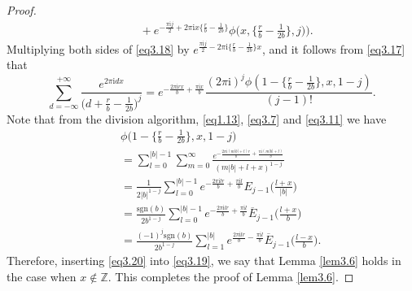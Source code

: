 \documentclass[10pt,a4paper]{amsart}
\begin{document}
\begin{proof}
\begin{eqnarray}
&&\quad+e^{-\frac{\pi \mathrm{i}j}{2}+2\pi\mathrm{i}x\{\frac{r}{b}-\frac{1}{2b}\}}\phi\biggl(x,\biggl\{\frac{r}{b}-\frac{1}{2b}\biggl\},j\biggl)\biggl).
\end{eqnarray}
Multiplying both sides of \eqref{eq3.18} by $e^{\frac{\pi \mathrm{i}j}{2}-2\pi\mathrm{i}\{\frac{r}{b}-\frac{1}{2b}\}x}$, and it follows from \eqref{eq3.17} that
\begin{equation}\label{eq3.19}
\sum_{d=-\infty}^{+\infty}\frac{e^{2\pi \mathrm{i}dx}}{\bigl(d+\frac{r}{b}-\frac{1}{2b}\bigl)^{j}}
=e^{-\frac{2\pi \mathrm{i}rx}{b}+\frac{\pi \mathrm{i}x}{b}}\frac{(2\pi \mathrm{i})^{j}\phi(1-\{\frac{r}{b}-\frac{1}{2b}\},x,1-j)}{(j-1)!}.
\end{equation}
Note that from the division algorithm, \eqref{eq1.13}, \eqref{eq3.7} and \eqref{eq3.11} we have
\begin{eqnarray}\label{eq3.20}
&&\phi\biggl(1-\biggl\{\frac{r}{b}-\frac{1}{2b}\biggl\},x,1-j\biggl)\nonumber\\
&&=\sum_{l=0}^{|b|-1}\sum_{m=0}^{\infty}\frac{e^{-\frac{2\pi \mathrm{i}(m|b|+l)r}{b}+\frac{\pi \mathrm{i}(m|b|+l)}{b}}}{(m|b|+l+x)^{1-j}}\nonumber\\
&&=\frac{1}{2|b|^{1-j}}\sum_{l=0}^{|b|-1}e^{-\frac{2\pi \mathrm{i}lr}{b}+\frac{\pi \mathrm{i}l}{b}}E_{j-1}\biggl(\frac{l+x}{|b|}\biggl)\nonumber\\
&&=\frac{\mathrm{sgn}(b)}{2b^{1-j}}\sum_{l=0}^{|b|-1}e^{-\frac{2\pi \mathrm{i}lr}{b}+\frac{\pi \mathrm{i}l}{b}}\overline{E}_{j-1}\biggl(\frac{l+x}{b}\biggl)\nonumber\\
&&=\frac{(-1)^{j}\mathrm{sgn}(b)}{2b^{1-j}}\sum_{l=1}^{|b|}e^{\frac{2\pi \mathrm{i}lr}{b}-\frac{\pi \mathrm{i}l}{b}}\overline{E}_{j-1}\biggl(\frac{l-x}{b}\biggl).
\end{eqnarray}
Therefore, inserting \eqref{eq3.20} into \eqref{eq3.19}, we say that Lemma \ref{lem3.6} holds in the case when $x\not\in\mathbb{Z}$. This completes the proof of Lemma \ref{lem3.6}.
\end{proof}
\end{document}

